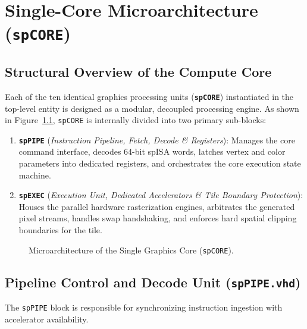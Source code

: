 \chapter{Single-Core Microarchitecture (\texttt{spCORE})}
\label{chap:core_microarchitecture}

\section{Structural Overview of the Compute Core}
Each of the ten identical graphics processing units (\textbf{\texttt{spCORE}}) instantiated in the top-level entity is designed as a modular, decoupled processing engine. As shown in Figure~\ref{fig:single_core}, \texttt{spCORE} is internally divided into two primary sub-blocks:
\begin{enumerate}
    \item \textbf{\texttt{spPIPE}} (\textit{Instruction Pipeline, Fetch, Decode \& Registers}): Manages the core command interface, decodes 64-bit spISA words, latches vertex and color parameters into dedicated registers, and orchestrates the core execution state machine.
    \item \textbf{\texttt{spEXEC}} (\textit{Execution Unit, Dedicated Accelerators \& Tile Boundary Protection}): Houses the parallel hardware rasterization engines, arbitrates the generated pixel streams, handles swap handshaking, and enforces hard spatial clipping boundaries for the tile.
\end{enumerate}

\begin{figure}[htbp]
\centering
\resizebox{0.95\textwidth}{!}{
    
}
\caption{Microarchitecture of the Single Graphics Core (\texttt{spCORE}).}
\label{fig:single_core}
\end{figure}

\section{Pipeline Control and Decode Unit (\texttt{spPIPE.vhd})}
The \texttt{spPIPE} block is responsible for synchronizing instruction ingestion with accelerator availability.


